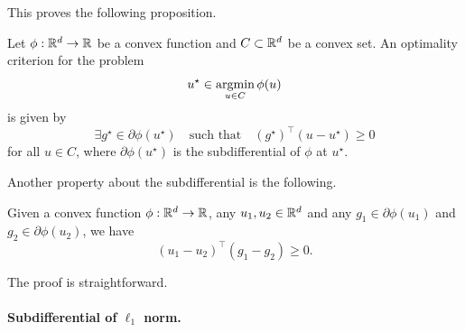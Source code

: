 This proves the following proposition.
\begin{proposition}
	\label{prop:optimality-criterion}
	Let $\phi : \mathbb R^d \rightarrow \mathbb R$ be a convex function and $C \subset \mathbb R^d$ be a convex set. 
	An optimality criterion for the problem
	\begin{equation*}
		u^\star \in \operatorname*{argmin}_{u \in C} \phi(u)
	\end{equation*}
	is given by
	\begin{equation*}
		\exists g^\star \in \partial \phi(u^\star) \quad \text{such that} 
		\quad (g^\star)^\top (u - u^\star) \geq 0
	\end{equation*}
	for all $u \in C$, where $\partial \phi(u^\star)$ is the subdifferential of $\phi$ at $u^\star$.
\end{proposition}

Another property about the subdifferential is the following.
\begin{proposition}
	Given a convex function $\phi : \mathbb R^d \rightarrow \mathbb R$, any $u_1, u_2 \in \mathbb R^d$ and any $g_1 \in \partial \phi(u_1)$ and $g_2 \in \partial \phi(u_2)$, we have
	\begin{equation*}
		(u_1 - u_2)^\top (g_1 - g_2) \geq 0.
	\end{equation*}
\end{proposition}
The proof is straightforward.%

\paragraph{Subdifferential of $\ell_1$ norm.} 

